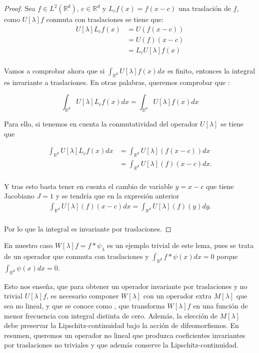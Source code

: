 \begin{proof}
  Sea $f \in L^2(\mathbb{R}^d)$, $c \in \mathbb{R}^d$ y $L_cf(x)=f(x-c)$ una traslación de $f$, como $U[\lambda]f$ conmuta con traslaciones se tiene que: 
  \begin{align*}
    U[\lambda]L_cf(x)&=U(f(x-c)) \\
    &=U(f)(x-c) \\
    &=L_cU[\lambda]f(x)\\
  \end{align*}

  \noindent Vamos a comprobar ahora que si $\int_{\mathbb{R}^d} U[\lambda]f(x)dx$ es finito, entonces la integral es invariante a traslaciones. En otras palabras, queremos comprobar que : 

  $$\int_{\mathbb{R}^d} U[\lambda]L_cf(x)dx=\int_{\mathbb{R}^d} U[\lambda]f(x)dx$$

  Para ello, si tenemos en cuenta la conmutatividad del operador $U[\lambda]$ se tiene que 
  
  \begin{align*}
    \int_{\mathbb{R}^d} U[\lambda]L_cf(x)dx &= \int_{\mathbb{R}^d} U[\lambda](f(x-c))dx \\
    &= \int_{\mathbb{R}^d} U[\lambda](f)(x-c)dx. \\
  \end{align*}

  \noindent Y tras esto basta tener en cuenta el cambio de variable $y=x-c$ que tiene Jacobiano $J=1$ y se tendría que en la expresión anterior
  \begin{align*}
    \int_{\mathbb{R}^d} U[\lambda](f)(x-c)dx = \int_{\mathbb{R}^d} U[\lambda](f)(y)dy .\\
  \end{align*}
  
  \noindent Por lo que la integral es invariante por traslaciones.
\end{proof}

\noindent En nuestro caso $W[\lambda]f=f\ast\psi_\lambda$ es un ejemplo trivial de este lema, pues se trata de un operador que conmuta con traslaciones y $\int_{\mathbb{R}^d} f \ast \psi(x) dx=0$ porque $\int_{\mathbb{R}^d} \psi(x)dx=0$.

\medskip

\noindent Esto nos enseña, que para obtener un operador invariante por traslaciones y no trivial $U[\lambda]f$, es necesario componer $W[\lambda]$ con un operador extra $M[\lambda]$ que sea no lineal, y que se conoce como , que transforma $W[\lambda]f$ en una función de menor frecuencia con integral distinta de cero. Además, la elección de $M[\lambda]$ debe preservar la Lipschitz-continuidad bajo la acción de difeomorfismos.    
En resumen, queremos un operador no lineal que produzca coeficientes invariantes por traslaciones no triviales y que además conserve la Lipschitz-continuidad.


